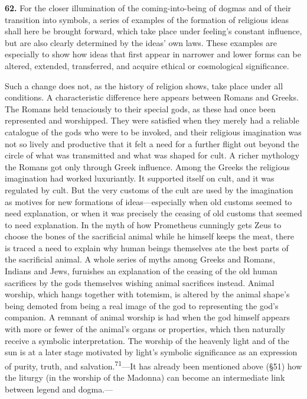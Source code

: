 \documentclass[12pt,a4paper]{book}
\newcommand{\opage}[1]{\marginnote{\footnotesize\textit{[#1]}}}
\begin{document}
\medskip

\noindent\textbf{62.} For the closer illumination of the coming-into-being of dogmas and
of their transition into symbols, a series of examples of the formation of religious ideas
shall here be brought forward, which take place under feeling's constant influence, but are
also clearly determined by the ideas' own laws. These examples are especially to show how
ideas that first appear in narrower and lower forms can be altered, extended, transferred,
and acquire ethical or cosmological significance.

Such a change does not, as the history of religion shows, take place under all conditions. A
characteristic difference here appears between Romans and Greeks. The Romans held tenaciously
to their special gods, as these had once been represented and worshipped. They were satisfied
when they merely had a reliable catalogue of the gods who were to be invoked, and their
religious imagination was not so lively and productive that it felt a need for a further
flight out beyond the circle of what was transmitted and what was shaped for cult. A richer
mythology the Romans got only through Greek influence. Among the Greeks the religious
imagination had worked luxuriantly. It supported itself on cult, and it was regulated by cult.
But the very customs of the cult are used by the imagination as motives for new formations of
ideas---especially when old customs seemed to need explanation, or when it was precisely the
ceasing of old customs that seemed to need explanation. In the myth of how Prometheus
cunningly gets Zeus to choose the bones of the sacrificial animal while he himself keeps the
meat, there is traced a need to explain why human beings themselves ate the best parts of the
sacrificial animal. A whole series of myths among Greeks and Romans, Indians and Jews, furnishes
an explanation of the ceasing of the old human sacrifices by the gods themselves wishing animal
sacrifices instead. Animal worship, which hangs together with totemism, is altered by the animal
shape's being demoted from being a real image of the god to representing the god's companion. A
remnant of animal worship is had when the god himself appears with more or fewer of the animal's
organs or 
\opage{142}properties, which then naturally receive a symbolic interpretation. The worship of the
heavenly light and of the sun is at a later stage motivated by light's symbolic significance as
an expression of purity, truth, and salvation.\textsuperscript{71}---It has already been
mentioned above (§51) how the liturgy (in the worship of the Madonna) can become an intermediate
link between legend and dogma.---
\end{document}
